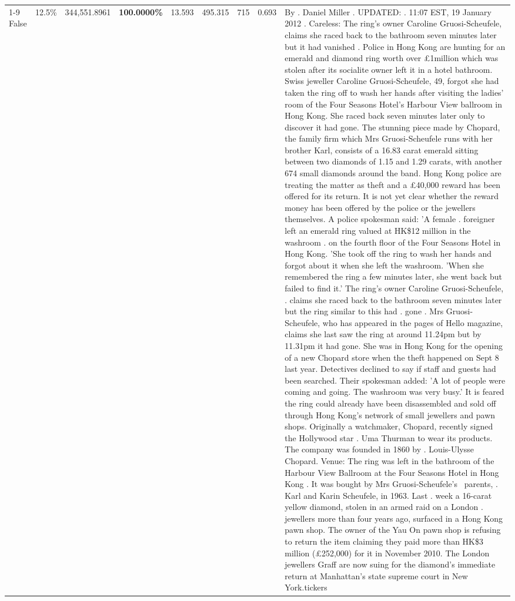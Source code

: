 \begin{table}[H]
\begin{tabular}{lllrlllll}
\cline{1-9}
False & 12.5\% & 344,551.8961 & \bfseries \color{red} 100.0000\% & 13.593 & 495.315 & 715 & 0.693 & By . Daniel Miller . UPDATED: . 11:07 EST, 19 January 2012 . Careless: The ring's owner Caroline Gruosi-Scheufele, claims she raced back to the bathroom seven minutes later but it had vanished . Police in Hong Kong are hunting for an emerald and diamond ring worth over £1million which was stolen after its socialite owner left it in a hotel bathroom. Swiss jeweller Caroline Gruosi-Scheufele, 49, forgot she had taken the ring off to wash her hands after visiting the ladies' room of the Four Seasons Hotel's Harbour View ballroom in Hong Kong. She raced back seven minutes later only to discover it had gone. The stunning piece made by Chopard, the family firm which Mrs Gruosi-Scheufele runs with her brother Karl, consists of a 16.83 carat emerald sitting between two diamonds of 1.15 and 1.29 carats, with another 674 small diamonds around the band. Hong Kong police are treating the matter as theft and a £40,000 reward has been offered for its return. It is not yet clear whether the reward money has been offered by the police or the jewellers themselves. A police spokesman said: 'A female . foreigner left an emerald ring valued at HK\$12 million in the washroom . on the fourth floor of the Four Seasons Hotel in Hong Kong. 'She took off the ring to wash her hands and forgot about it when she left the washroom. 'When she remembered the ring a few minutes later, she went back but failed to find it.' The ring's owner Caroline Gruosi-Scheufele, . claims she raced back to the bathroom seven minutes later but the ring similar to this had . gone . Mrs Gruosi-Scheufele, who has appeared in the pages of Hello magazine, claims she last saw the ring at around 11.24pm but by 11.31pm it had gone. She was in Hong Kong for the opening of a new Chopard store when the theft happened on Sept 8 last year. Detectives declined to say if staff and guests had been searched. Their spokesman added: 'A lot of people were coming and going. The washroom was very busy.' It is feared the ring could already have been disassembled and sold off through Hong Kong's network of small jewellers and pawn shops. Originally a watchmaker, Chopard, recently signed the Hollywood star . Uma Thurman to wear its products. The company was founded in 1860 by . Louis-Ulysse Chopard. Venue: The ring was left in the bathroom of the Harbour View Ballroom at the Four Seasons Hotel in Hong Kong . It was bought by Mrs Gruosi-Scheufele's  parents, . Karl and Karin Scheufele, in 1963. Last . week a 16-carat yellow diamond, stolen in an armed raid on a London . jewellers more than four years ago, surfaced in a Hong Kong pawn shop. The owner of the Yau On pawn shop is refusing to return the item claiming they paid more than HK\$3 million (£252,000) for it in November 2010. The London jewellers Graff are now suing for the diamond’s immediate return at Manhattan’s state supreme court in New York.tickers \\

\end{tabular}
\end{table}
